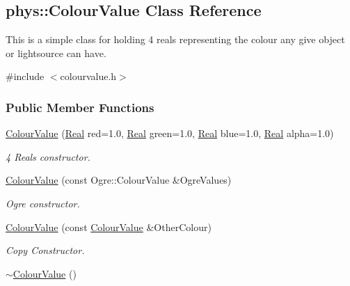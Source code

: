 \hypertarget{classphys_1_1ColourValue}{
\subsection{phys::ColourValue Class Reference}
\label{d3/db0/classphys_1_1ColourValue}
}


This is a simple class for holding 4 reals representing the colour any give object or lightsource can have.  




{\ttfamily \#include $<$colourvalue.h$>$}

\subsubsection*{Public Member Functions}
\begin{DoxyCompactItemize}
\item 
\hyperlink{classphys_1_1ColourValue_a5470d004419e18f52f520560328abf51}{ColourValue} (\hyperlink{namespacephys_af7eb897198d265b8e868f45240230d5f}{Real} red=1.0, \hyperlink{namespacephys_af7eb897198d265b8e868f45240230d5f}{Real} green=1.0, \hyperlink{namespacephys_af7eb897198d265b8e868f45240230d5f}{Real} blue=1.0, \hyperlink{namespacephys_af7eb897198d265b8e868f45240230d5f}{Real} alpha=1.0)
\begin{DoxyCompactList}\small\item\em 4 Reals constructor. \item\end{DoxyCompactList}\item 
\hyperlink{classphys_1_1ColourValue_ac814df9f1709186fa6aeadbca8e0ed9f}{ColourValue} (const Ogre::ColourValue \&OgreValues)
\begin{DoxyCompactList}\small\item\em Ogre constructor. \item\end{DoxyCompactList}\item 
\hyperlink{classphys_1_1ColourValue_add6b3ac7e9809dce240cd584b94e8c67}{ColourValue} (const \hyperlink{classphys_1_1ColourValue}{ColourValue} \&OtherColour)
\begin{DoxyCompactList}\small\item\em Copy Constructor. \item\end{DoxyCompactList}\item 
\hypertarget{classphys_1_1ColourValue_adc37cfdba61d80ad23765cea5c858751}{
\hyperlink{classphys_1_1ColourValue_adc37cfdba61d80ad23765cea5c858751}{$\sim$ColourValue} ()}
\label{d3/db0/classphys_1_1ColourValue_adc37cfdba61d80ad23765cea5c858751}


\end{DoxyCompactItemize}
